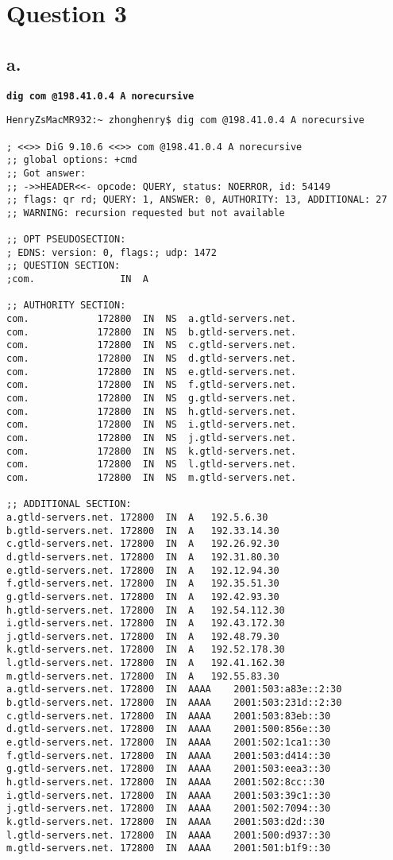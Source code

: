 \documentclass[12pt]{article}
\newcommand{\ilc}{\texttt}
\begin{document}
\section{Question 3}

\subsection{a.}
\textbf{\ilc{dig com @198.41.0.4 A norecursive}}
\begin{verbatim}
HenryZsMacMR932:~ zhonghenry$ dig com @198.41.0.4 A norecursive

; <<>> DiG 9.10.6 <<>> com @198.41.0.4 A norecursive
;; global options: +cmd
;; Got answer:
;; ->>HEADER<<- opcode: QUERY, status: NOERROR, id: 54149
;; flags: qr rd; QUERY: 1, ANSWER: 0, AUTHORITY: 13, ADDITIONAL: 27
;; WARNING: recursion requested but not available

;; OPT PSEUDOSECTION:
; EDNS: version: 0, flags:; udp: 1472
;; QUESTION SECTION:
;com.				IN	A

;; AUTHORITY SECTION:
com.			172800	IN	NS	a.gtld-servers.net.
com.			172800	IN	NS	b.gtld-servers.net.
com.			172800	IN	NS	c.gtld-servers.net.
com.			172800	IN	NS	d.gtld-servers.net.
com.			172800	IN	NS	e.gtld-servers.net.
com.			172800	IN	NS	f.gtld-servers.net.
com.			172800	IN	NS	g.gtld-servers.net.
com.			172800	IN	NS	h.gtld-servers.net.
com.			172800	IN	NS	i.gtld-servers.net.
com.			172800	IN	NS	j.gtld-servers.net.
com.			172800	IN	NS	k.gtld-servers.net.
com.			172800	IN	NS	l.gtld-servers.net.
com.			172800	IN	NS	m.gtld-servers.net.

;; ADDITIONAL SECTION:
a.gtld-servers.net.	172800	IN	A	192.5.6.30
b.gtld-servers.net.	172800	IN	A	192.33.14.30
c.gtld-servers.net.	172800	IN	A	192.26.92.30
d.gtld-servers.net.	172800	IN	A	192.31.80.30
e.gtld-servers.net.	172800	IN	A	192.12.94.30
f.gtld-servers.net.	172800	IN	A	192.35.51.30
g.gtld-servers.net.	172800	IN	A	192.42.93.30
h.gtld-servers.net.	172800	IN	A	192.54.112.30
i.gtld-servers.net.	172800	IN	A	192.43.172.30
j.gtld-servers.net.	172800	IN	A	192.48.79.30
k.gtld-servers.net.	172800	IN	A	192.52.178.30
l.gtld-servers.net.	172800	IN	A	192.41.162.30
m.gtld-servers.net.	172800	IN	A	192.55.83.30
a.gtld-servers.net.	172800	IN	AAAA	2001:503:a83e::2:30
b.gtld-servers.net.	172800	IN	AAAA	2001:503:231d::2:30
c.gtld-servers.net.	172800	IN	AAAA	2001:503:83eb::30
d.gtld-servers.net.	172800	IN	AAAA	2001:500:856e::30
e.gtld-servers.net.	172800	IN	AAAA	2001:502:1ca1::30
f.gtld-servers.net.	172800	IN	AAAA	2001:503:d414::30
g.gtld-servers.net.	172800	IN	AAAA	2001:503:eea3::30
h.gtld-servers.net.	172800	IN	AAAA	2001:502:8cc::30
i.gtld-servers.net.	172800	IN	AAAA	2001:503:39c1::30
j.gtld-servers.net.	172800	IN	AAAA	2001:502:7094::30
k.gtld-servers.net.	172800	IN	AAAA	2001:503:d2d::30
l.gtld-servers.net.	172800	IN	AAAA	2001:500:d937::30
m.gtld-servers.net.	172800	IN	AAAA	2001:501:b1f9::30


\end{verbatim}
\end{document}
